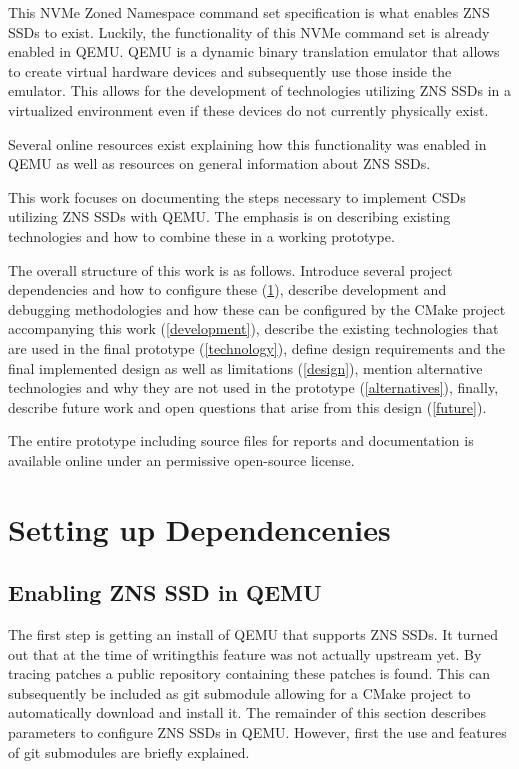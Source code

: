 \documentclass[conference]{IEEEtran}
\begin{document}
This NVMe Zoned Namespace command set specification is what enables ZNS SSDs to
exist\cite{nvme-zns}. Luckily, the functionality of this NVMe command set is
already enabled in QEMU. QEMU is a dynamic binary translation emulator that
allows to create virtual hardware devices and subsequently use those inside the
emulator. This allows for the development of technologies utilizing ZNS SSDs in
a virtualized environment even if these devices do not currently physically
exist.

Several online resources exist explaining how this functionality was enabled in
QEMU\cite{nvme-qemu-1,nvme-qemu-2} as well as resources on general information
about ZNS SSDs\cite{zns-info}.

This work focuses on documenting the steps necessary to implement CSDs
utilizing ZNS SSDs with QEMU. The emphasis is on describing existing
technologies and how to combine these in a working prototype.

The overall structure of this work is as follows. Introduce several project
dependencies and how to configure these (\cref{dependencies}), describe
development and debugging methodologies and how these can be configured by
the CMake project accompanying this work (\cref{development}), describe the
existing technologies that are used in the final prototype (\cref{technology}),
define design requirements and the final implemented design as well as
limitations (\cref{design}), mention alternative technologies and why they
are not used in the prototype (\cref{alternatives}), finally, describe future
work and open questions that arise from this design (\cref{future}).

The entire prototype including source files for reports and documentation
is available online under an permissive open-source license\cite{qemu-csd}.

\section{Setting up Dependencenies} \label{dependencies}

\subsection{Enabling ZNS SSD in QEMU}

The first step is getting an install of QEMU that supports ZNS SSDs. It turned
out that at the time of writing\footnotemark[1] this feature was not actually
upstream yet. By tracing patches a public repository containing these patches
is found. This can subsequently be included as git submodule allowing for a
CMake project to automatically download and install it. The remainder of this
section describes parameters to configure ZNS SSDs in QEMU. However, first the
use and features of git submodules are briefly explained.
\end{document}
